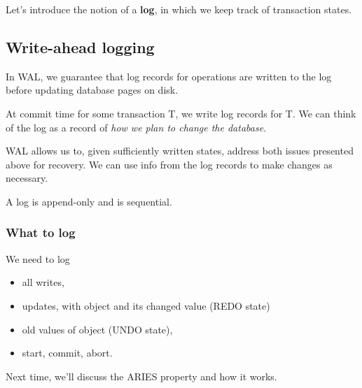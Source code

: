 \documentclass{article}
\begin{document}
Let's introduce the notion of a \textbf{log}, in which we keep track of transaction states.

\subsection{Write-ahead logging}

In WAL, we guarantee that log records for operations are written to the log before updating database pages on disk.

At commit time for some transaction T, we write log records for T. We can think of the log as a record of \emph{how we plan to change the database}.

WAL allows us to, given sufficiently written states, address both issues presented above for recovery. We can use info from the log records to make changes as necessary.

A log is append-only and is sequential.

\subsubsection{What to log}

We need to log \begin{itemize}
\item all writes,
\item updates, with object and its changed value (REDO state)
\item old values of object (UNDO state),
\item start, commit, abort.
\end{itemize}

Next time, we'll discuss the ARIES property and how it works.
\end{document}
